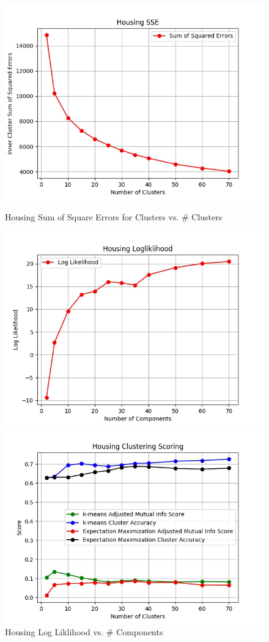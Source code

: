 \documentclass[h]{article}
\begin{document}
 \begin{figure}[H]
      \includegraphics[width=1\textwidth,keepaspectratio]{housing_sse.jpg} 
      \caption*{Housing Sum of Square Errors for Clusters vs. \# Clusters} 
   \endminipage\hfill
      \includegraphics[width=1\textwidth,keepaspectratio]{housing_logliklihood.jpg} 
      \caption*{Housing Log Liklihood vs. \# Components} 
   \endminipage\hfill
      \includegraphics[width=1\textwidth,keepaspectratio]{housing_clustering_scoring.jpg} 

\end{figure}
\end{document}
